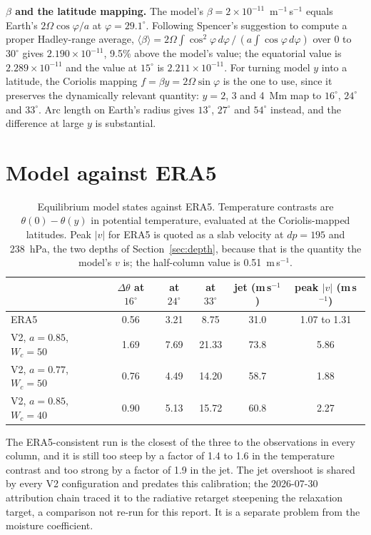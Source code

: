 \documentclass[11pt]{article}
\begin{document}
\textbf{$\beta$ and the latitude mapping.} The model's $\beta = 2\times
10^{-11}$~m$^{-1}$\,s$^{-1}$ equals Earth's $2\Omega\cos\varphi/a$ at
$\varphi = 29.1^\circ$. Following Spencer's suggestion to compute a proper
Hadley-range average, $\langle\beta\rangle = 2\Omega\int\cos^2\varphi\,
d\varphi \,/\, \left(a\int\cos\varphi\,d\varphi\right)$ over $0$ to $30^\circ$
gives $2.190\times10^{-11}$, 9.5\% above the model's value; the equatorial
value is $2.289\times10^{-11}$ and the value at $15^\circ$ is
$2.211\times10^{-11}$. For turning model $y$ into a latitude, the Coriolis
mapping $f = \beta y = 2\Omega\sin\varphi$ is the one to use, since it preserves
the dynamically relevant quantity: $y = 2$, 3 and 4~Mm map to $16^\circ$,
$24^\circ$ and $33^\circ$. Arc length on Earth's radius gives $13^\circ$,
$27^\circ$ and $54^\circ$ instead, and the difference at large $y$ is
substantial.

\section{Model against ERA5}
\label{sec:score}

\begin{table}[htbp]
\centering
\caption{Equilibrium model states against ERA5. Temperature contrasts are
$\theta(0)-\theta(y)$ in potential temperature, evaluated at the
Coriolis-mapped latitudes. Peak $|v|$ for ERA5 is quoted as a slab velocity at
$dp = 195$ and 238~hPa, the two depths of Section~\ref{sec:depth}, because that
is the quantity the model's $v$ is; the half-column value is
0.51~m\,s$^{-1}$.}
\label{tab:score}
\begin{tabular}{lccccc}
\toprule
 & $\Delta\theta$ at $16^\circ$ & at $24^\circ$ & at $33^\circ$
 & jet (m\,s$^{-1}$) & peak $|v|$ (m\,s$^{-1}$)\\
\midrule
ERA5                        & 0.56 & 3.21 & 8.75  & 31.0 & 1.07 to 1.31\\
V2, $a=0.85$, $W_c=50$      & 1.69 & 7.69 & 21.33 & 73.8 & 5.86\\
V2, $a=0.77$, $W_c=50$      & 0.76 & 4.49 & 14.20 & 58.7 & 1.88\\
V2, $a=0.85$, $W_c=40$      & 0.90 & 5.13 & 15.72 & 60.8 & 2.27\\
\bottomrule
\end{tabular}
\end{table}

The ERA5-consistent run is the closest of the three to the observations in
every column, and it is still too steep by a factor of 1.4 to 1.6 in the
temperature contrast and too strong by a factor of 1.9 in the jet. The jet
overshoot is shared by every V2 configuration and predates this calibration; the
2026-07-30 attribution chain traced it to the radiative retarget steepening the
relaxation target, a comparison not re-run for this report. It is a separate
problem from the moisture coefficient.
\end{document}

